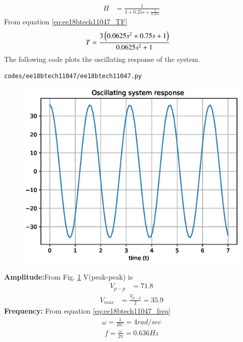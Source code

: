 \begin{enumerate}[label=\thesection.\arabic*.,ref=\thesection.\theenumi]
\begin{align}
H &= \frac{1}{3 + 0.25s + \frac{1}{0.25s}}
\end{align}
From equation \eqref{eq:ee18btech11047_TF}
\begin{align}
T &= \frac{3\left(0.0625s^{2} + 0.75s + 1\right)}{0.0625s^{2} + 1}
\end{align}
The following code plots the oscillating response of the system.
\begin{lstlisting}
codes/ee18btech11047/ee18btech11047.py
\end{lstlisting}
\begin{figure}[!ht]
\centering
\includegraphics[width=\columnwidth]{./figs/ee18btech11047/ee18btech11047.eps}
\caption{}
\label{fig:ee18btech11047_fig8}
\end{figure}
\textbf{Amplitude:}From Fig. \ref{fig:ee18btech11047_fig8} V(peak-peak) is 
\begin{align}
V_{p-p} &= 71.8
\end{align}
\begin{align}
V_{max} &= \frac{V_{p-p}}{2} =35.9
\end{align}
\textbf{Frequency:} From equation \eqref{eq:ee18btech11047_freq}
\begin{align}
\omega = \frac{1}{RC} = 4 rad/sec
\end{align}
\begin{align}
f = \frac{\omega }{2\pi} = 0.636 Hz
\end{align}
\end{enumerate}
